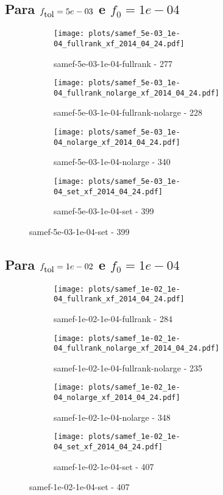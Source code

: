 \newpage
\subsection{Para $f_{\mbox{tol}} = 5e-03$ e $f_0 = 1e-04$}

\begin{figure}[H]
  \centering
  \begin{subfigure}{0.48\textwidth}
    \texttt{[image: plots/samef\_5e-03\_1e-04\_fullrank\_xf\_2014\_04\_24.pdf]}
    \caption{samef-5e-03-1e-04-fullrank - 277}
  \end{subfigure}
  \begin{subfigure}{0.48\textwidth}
    \texttt{[image: plots/samef\_5e-03\_1e-04\_fullrank\_nolarge\_xf\_2014\_04\_24.pdf]}
    \caption{samef-5e-03-1e-04-fullrank-nolarge - 228}
  \end{subfigure}
  \begin{subfigure}{0.48\textwidth}
    \texttt{[image: plots/samef\_5e-03\_1e-04\_nolarge\_xf\_2014\_04\_24.pdf]}
    \caption{samef-5e-03-1e-04-nolarge - 340}
  \end{subfigure}
  \begin{subfigure}{0.48\textwidth}
    \texttt{[image: plots/samef\_5e-03\_1e-04\_set\_xf\_2014\_04\_24.pdf]}
    \caption{samef-5e-03-1e-04-set - 399}
  \end{subfigure}
\end{figure}

\newpage
\subsection{Para $f_{\mbox{tol}} = 1e-02$ e $f_0 = 1e-04$}

\begin{figure}[H]
  \centering
  \begin{subfigure}{0.48\textwidth}
    \texttt{[image: plots/samef\_1e-02\_1e-04\_fullrank\_xf\_2014\_04\_24.pdf]}
    \caption{samef-1e-02-1e-04-fullrank - 284}
  \end{subfigure}
  \begin{subfigure}{0.48\textwidth}
    \texttt{[image: plots/samef\_1e-02\_1e-04\_fullrank\_nolarge\_xf\_2014\_04\_24.pdf]}
    \caption{samef-1e-02-1e-04-fullrank-nolarge - 235}
  \end{subfigure}
  \begin{subfigure}{0.48\textwidth}
    \texttt{[image: plots/samef\_1e-02\_1e-04\_nolarge\_xf\_2014\_04\_24.pdf]}
    \caption{samef-1e-02-1e-04-nolarge - 348}
  \end{subfigure}
  \begin{subfigure}{0.48\textwidth}
    \texttt{[image: plots/samef\_1e-02\_1e-04\_set\_xf\_2014\_04\_24.pdf]}
    \caption{samef-1e-02-1e-04-set - 407}
  \end{subfigure}
\end{figure}

